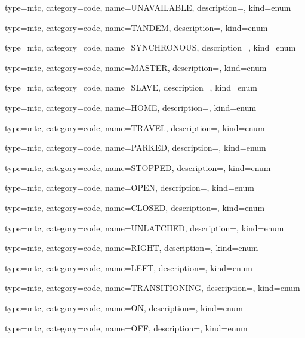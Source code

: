 {
  type=mtc,
  category=code,
  name={UNAVAILABLE},
  description={},
  kind={enum}
}


{
  type=mtc,
  category=code,
  name={TANDEM},
  description={},
  kind={enum}
}


{
  type=mtc,
  category=code,
  name={SYNCHRONOUS},
  description={},
  kind={enum}
}


{
  type=mtc,
  category=code,
  name={MASTER},
  description={},
  kind={enum}
}


{
  type=mtc,
  category=code,
  name={SLAVE},
  description={},
  kind={enum}
}


{
  type=mtc,
  category=code,
  name={HOME},
  description={},
  kind={enum}
}


{
  type=mtc,
  category=code,
  name={TRAVEL},
  description={},
  kind={enum}
}


{
  type=mtc,
  category=code,
  name={PARKED},
  description={},
  kind={enum}
}


{
  type=mtc,
  category=code,
  name={STOPPED},
  description={},
  kind={enum}
}


{
  type=mtc,
  category=code,
  name={OPEN},
  description={},
  kind={enum}
}


{
  type=mtc,
  category=code,
  name={CLOSED},
  description={},
  kind={enum}
}


{
  type=mtc,
  category=code,
  name={UNLATCHED},
  description={},
  kind={enum}
}


{
  type=mtc,
  category=code,
  name={RIGHT},
  description={},
  kind={enum}
}


{
  type=mtc,
  category=code,
  name={LEFT},
  description={},
  kind={enum}
}


{
  type=mtc,
  category=code,
  name={TRANSITIONING},
  description={},
  kind={enum}
}


{
  type=mtc,
  category=code,
  name={ON},
  description={},
  kind={enum}
}


{
  type=mtc,
  category=code,
  name={OFF},
  description={},
  kind={enum}
}


